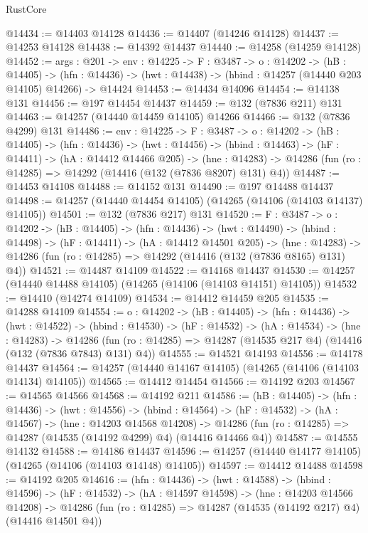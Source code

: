 \begin{lexlean}{RustCore}
\begin{coremodule}
@14434 := @14403 @14128
@14436 := @14407 (@14246 @14128)
@14437 := @14253 @14128
@14438 := @14392 @14437
@14440 := @14258 (@14259 @14128)
@14452 := {args : @201} ->
  {env : @14225} ->
  {F : @3487} ->
  {o : @14202} ->
  (hB : @14405) ->
  (hfn : @14436) -> (hwt : @14438) -> (hbind : @14257 (@14440 @203 @14105) @14266) -> @14424
@14453 := @14434 @14096
@14454 := @14138 @131
@14456 := @197 @14454 @14437
@14459 := @132 (@7836 @211) @131
@14463 := @14257 (@14440 @14459 @14105) @14266
@14466 := @132 (@7836 @4299) @131
@14486 := {env : @14225} ->
  {F : @3487} ->
  {o : @14202} ->
  (hB : @14405) ->
  (hfn : @14436) ->
  (hwt : @14456) ->
  (hbind : @14463) ->
  (hF : @14411) ->
  (hA : @14412 @14466 @205) ->
  (hne : @14283) -> @14286 (fun (ro : @14285) => @14292 (@14416 (@132 (@7836 @8207) @131) @4))
@14487 := @14453 @14108
@14488 := @14152 @131
@14490 := @197 @14488 @14437
@14498 := @14257 (@14440 @14454 @14105) (@14265 (@14106 (@14103 @14137) @14105))
@14501 := @132 (@7836 @217) @131
@14520 := {F : @3487} ->
  {o : @14202} ->
  (hB : @14405) ->
  (hfn : @14436) ->
  (hwt : @14490) ->
  (hbind : @14498) ->
  (hF : @14411) ->
  (hA : @14412 @14501 @205) ->
  (hne : @14283) -> @14286 (fun (ro : @14285) => @14292 (@14416 (@132 (@7836 @8165) @131) @4))
@14521 := @14487 @14109
@14522 := @14168 @14437
@14530 := @14257 (@14440 @14488 @14105) (@14265 (@14106 (@14103 @14151) @14105))
@14532 := @14410 (@14274 @14109)
@14534 := @14412 @14459 @205
@14535 := @14288 @14109
@14554 := {o : @14202} ->
  (hB : @14405) ->
  (hfn : @14436) ->
  (hwt : @14522) ->
  (hbind : @14530) ->
  (hF : @14532) ->
  (hA : @14534) ->
  (hne : @14283) ->
  @14286 (fun (ro : @14285) => @14287 (@14535 @217 @4) (@14416 (@132 (@7836 @7843) @131) @4))
@14555 := @14521 @14193
@14556 := @14178 @14437
@14564 := @14257 (@14440 @14167 @14105) (@14265 (@14106 (@14103 @14134) @14105))
@14565 := @14412 @14454
@14566 := @14192 @203
@14567 := @14565 @14566
@14568 := @14192 @211
@14586 := (hB : @14405) ->
  (hfn : @14436) ->
  (hwt : @14556) ->
  (hbind : @14564) ->
  (hF : @14532) ->
  (hA : @14567) ->
  (hne : @14203 @14568 @14208) ->
  @14286 (fun (ro : @14285) => @14287 (@14535 (@14192 @4299) @4) (@14416 @14466 @4))
@14587 := @14555 @14132
@14588 := @14186 @14437
@14596 := @14257 (@14440 @14177 @14105) (@14265 (@14106 (@14103 @14148) @14105))
@14597 := @14412 @14488
@14598 := @14192 @205
@14616 := (hfn : @14436) ->
  (hwt : @14588) ->
  (hbind : @14596) ->
  (hF : @14532) ->
  (hA : @14597 @14598) ->
  (hne : @14203 @14566 @14208) ->
  @14286 (fun (ro : @14285) => @14287 (@14535 (@14192 @217) @4) (@14416 @14501 @4))

\end{coremodule}
\end{lexlean}
